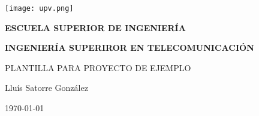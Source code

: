 

\begin{titlepage}

  \begin{center}

    \texttt{[image: upv.png]} \\
    
    \vspace{2.0cm}
    
    \LARGE{\textbf{ESCUELA SUPERIOR DE INGENIERÍA}} \\
    
    \vspace{1.0cm}
    
    \Large{\textbf{INGENIERÍA SUPERIROR EN TELECOMUNICACIÓN}} \\
    
    \vspace{3.0cm}
    
    \Large{PLANTILLA PARA PROYECTO DE EJEMPLO} \\
    
    \vspace{2.0cm}
    
    \Large{Lluís Satorre González} \\
  
    \vspace{0.5cm}

    \large{\today}
    
  \end{center}
\end{titlepage}
